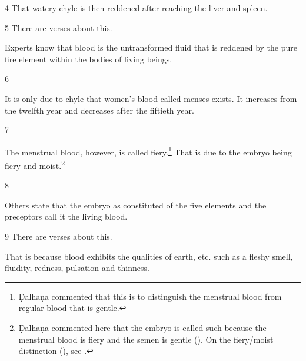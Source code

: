 \begin{translation}
\item [4]  
That watery chyle is then reddened after reaching the liver and spleen.

  
\item [5]
There are verses about this.

\begin{sloka}
Experts know that blood is the untransformed fluid that is reddened by the pure fire element within the bodies of living beings. %
\end{sloka}

\item [6]

\begin{sloka}
It is only due to chyle that women's blood called menses exists. It increases from the twelfth year and decreases after the fiftieth year. 
\end{sloka}

\item [7]

The menstrual blood, however, is called fiery.\footnote{Ḍalhaṇa commented that this is to distinguish the menstrual blood from regular blood that is gentle.} That is due to the embryo being fiery and moist.\footnote{Ḍalhaṇa commented here that the embryo is called such 
because the menstrual blood is fiery and the semen is gentle (). On  the fiery/moist distinction (), see \cite{wuja-2004,ange-2021}.}


\item [8]

Others state that the embryo as constituted of the five elements and the preceptors call it the living blood. 

\item [9]
There are verses about this.
\begin{sloka}
That is because blood exhibits the qualities of earth, etc. such as a fleshy smell, 
fluidity, redness, pulsation and thinness.
\end{sloka}


\end{translation}
